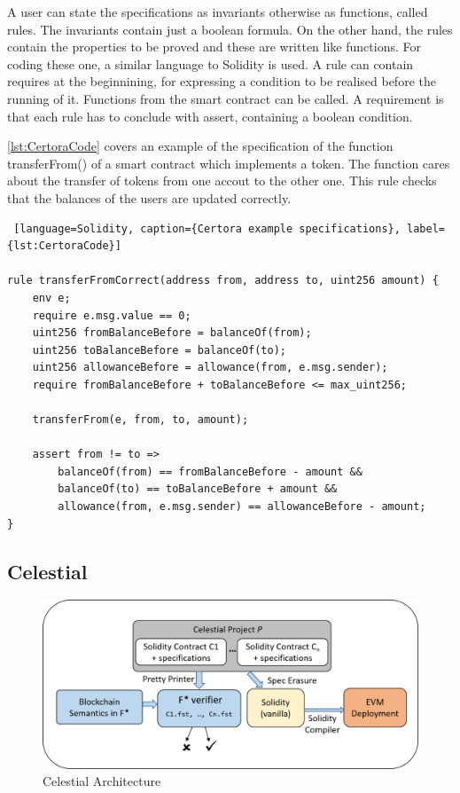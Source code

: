A user can state the specifications as invariants otherwise as functions, called rules.
The invariants contain just a boolean formula.
On the other hand, the rules contain the properties to be proved and these are written like functions. 
For coding these one, a similar language to Solidity is used. 
A rule can contain requires at the beginnining, for expressing a condition to be realised before the running of it. Functions from the smart contract can be called.
A requirement is that each rule has to conclude with assert, containing a boolean condition. 

\autoref{lst:CertoraCode} covers an example of the specification of the function transferFrom() of a smart contract which implements a token. 
The function cares about the transfer of tokens from one accout to the other one. This rule checks that the balances of the users are updated correctly. 
\begin{lstlisting} [language=Solidity, caption={Certora example specifications}, label={lst:CertoraCode}]

rule transferFromCorrect(address from, address to, uint256 amount) {
    env e;
    require e.msg.value == 0;
    uint256 fromBalanceBefore = balanceOf(from);
    uint256 toBalanceBefore = balanceOf(to);
    uint256 allowanceBefore = allowance(from, e.msg.sender);
    require fromBalanceBefore + toBalanceBefore <= max_uint256;

    transferFrom(e, from, to, amount);

    assert from != to =>
        balanceOf(from) == fromBalanceBefore - amount &&
        balanceOf(to) == toBalanceBefore + amount &&
        allowance(from, e.msg.sender) == allowanceBefore - amount;
}

\end{lstlisting}



\subsection{Celestial}

\label{sec:Specification:Celestial}
\begin{figure}
    \centering
    \includegraphics[width=13cm]{logos/CelestialArchitecture.png}
    \caption{Celestial Architecture}
    \label{fig:celestial_architecture}
\end{figure}

